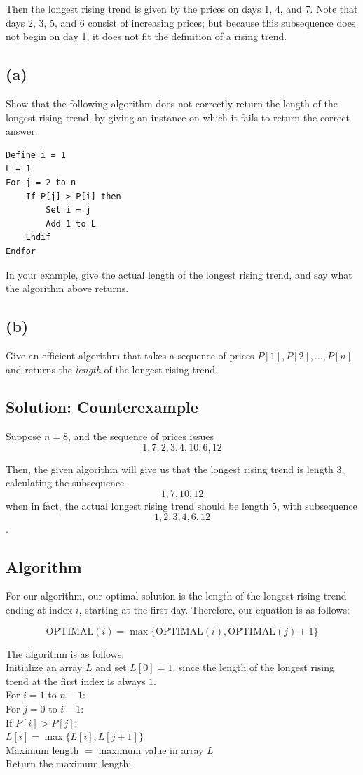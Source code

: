 \documentclass[letter,11pt]{article}
\begin{document}
Then the longest rising trend is given by the prices on days 1, 4, and 7. Note that days 2, 3, 5, and 6 consist of increasing prices; but because this subsequence does not begin on day 1, it does not fit the definition of a rising trend.

\subsection*{(a)}
Show that the following algorithm does not correctly return the length of the longest rising trend, by giving an instance on which it fails to return the correct answer.
\begin{verbatim}
Define i = 1
L = 1
For j = 2 to n
    If P[j] > P[i] then
        Set i = j
        Add 1 to L
    Endif
Endfor
\end{verbatim}
In your example, give the actual length of the longest rising trend, and say what the algorithm above returns.

\subsection*{(b)}
Give an efficient algorithm that takes a sequence of prices $P[1], P[2], \ldots, P[n]$ and returns the {\it length} of the longest rising trend.

\subsection{Solution: Counterexample}

Suppose $n = 8$, and the sequence of prices issues
\[1, 7, 2, 3, 4, 10, 6, 12\]

Then, the given algorithm will give us that the longest rising trend is length 3, calculating the subsequence
\[1, 7, 10, 12\]
when in fact, the actual longest rising trend should be length 5, with subsequence 
\[1, 2, 3, 4, 6, 12\].

\subsection{Algorithm}

For our algorithm, our optimal solution is the length of the longest rising trend ending at index $i$, starting at the first day. Therefore, our equation is as follows:

\[\text{OPTIMAL}(i) = \max \{ \text{OPTIMAL}(i), \text{OPTIMAL}(j) + 1 \}\]

\noindent The algorithm is as follows: \\
Initialize an array $L$ and set $L[0] = 1$, since the length of the longest rising trend at the first index is always $1$.\\
For $i = 1$ to $n - 1$:\\
\indent For $j = 0$ to $i - 1$:\\
\indent \indent If $P[i] > P[j]$:\\
\indent \indent \indent $L[i] = \max\{ L[i], L[j + 1]\}$\\
Maximum length $=$ maximum value in array $L$\\
Return the maximum length;\\
\end{document}
